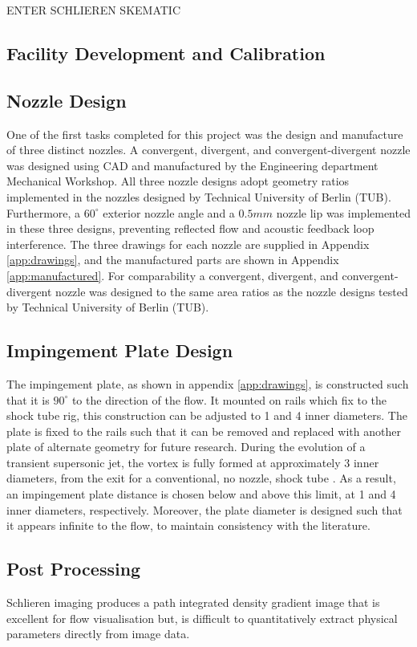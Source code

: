 ENTER SCHLIEREN SKEMATIC

\subsection{Facility Development and Calibration}

\subsection{Nozzle Design}
One of the first tasks completed for this project was the design and manufacture of three distinct nozzles. A convergent, divergent, and convergent-divergent nozzle was designed using CAD and manufactured by the Engineering department Mechanical Workshop. All three nozzle designs adopt geometry ratios implemented in the nozzles designed by Technical University of Berlin (TUB). Furthermore, a $60^\circ$ exterior nozzle angle and a $0.5mm$ nozzle lip was implemented in these three designs, preventing reflected flow and acoustic feedback loop interference. The three drawings for each nozzle are supplied in Appendix \ref{app:drawings}, and the manufactured parts are shown in Appendix \ref{app:manufactured}.
For comparability a convergent, divergent, and convergent-divergent nozzle was designed to the same area ratios as the nozzle designs tested by Technical University of Berlin (TUB). 

\subsection{Impingement Plate Design}
The impingement plate, as shown in appendix \ref{app:drawings}, is constructed such that it is $90^{\circ}$ to the direction of the flow. It mounted on rails which fix to the shock tube rig, this construction can be adjusted to 1 and 4 inner diameters. The plate is fixed to the rails such that it can be removed and replaced with another plate of alternate geometry for future research. During the evolution of a transient supersonic jet, the vortex is fully formed at approximately 3 inner diameters, from the exit for a conventional, no nozzle, shock tube \cite{mariani2013a}. As a result, an impingement plate distance is chosen below and above this limit, at 1 and 4 inner diameters, respectively. Moreover, the plate diameter is designed such that it appears infinite to the flow, to maintain consistency with the literature.

\subsection{Post Processing}
Schlieren imaging produces a path integrated density gradient image that is excellent for flow visualisation but, is difficult to quantitatively extract physical parameters directly from image data. 

